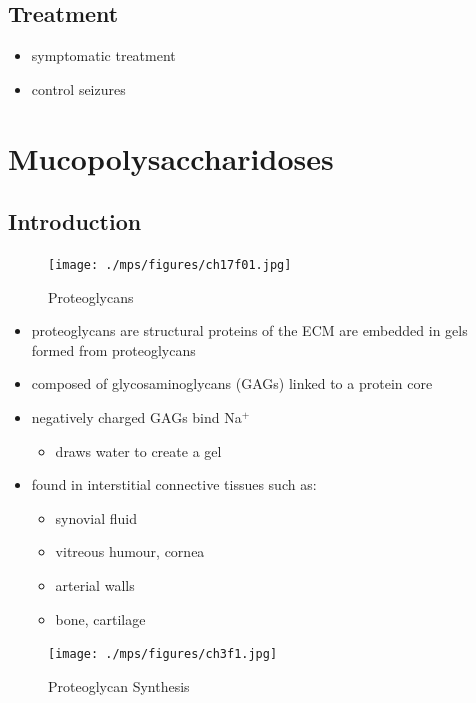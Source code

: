 \documentclass{scrartcl}
\begin{document}
\subsection{Treatment}
\label{sec:orgaf83e52}
\begin{itemize}
\item symptomatic treatment
\item control seizures
\end{itemize}

\section{Mucopolysaccharidoses}
\label{sec:org6667fa3}
\subsection{Introduction}
\label{sec:org079beb0}
\begin{figure}[htbp]
\centering
\texttt{[image: ./mps/figures/ch17f01.jpg]}
\caption[Proteoglycans]{\label{fig:org7e18ad8}
Proteoglycans}
\end{figure}

\begin{itemize}
\item proteoglycans are structural proteins of the ECM are embedded in gels formed from
proteoglycans
\item composed of glycosaminoglycans (GAGs) linked to a protein core
\item negatively charged GAGs bind Na\(^{\text{+}}\)
\begin{itemize}
\item draws water to create a gel
\end{itemize}
\item found in interstitial connective tissues such as: 
\begin{itemize}
\item synovial fluid
\item vitreous humour, cornea
\item arterial walls
\item bone, cartilage
\end{itemize}
\end{itemize}

\begin{figure}[htbp]
\centering
\texttt{[image: ./mps/figures/ch3f1.jpg]}
\caption[Proteoglycan Synthesis]{\label{fig:orgb77b5b0}
Proteoglycan Synthesis}
\end{figure}
\end{document}
